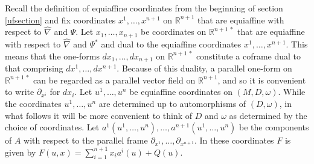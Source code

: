 \documentclass [leqno, 10pt]{amsart}
\theoremstyle{definition}
\numberwithin{equation}{section}
\newcommand{\om}{\omega}
\newcommand{\pr}{\partial}
\newcommand{\hnabla}{\widehat{\nabla}}
\newcommand{\rea}{\mathbb R}
\begin{document}
Recall the definition of equiaffine coordinates from the beginning of section \eqref{ufsection} and fix coordinates $x^{1}, \dots, x^{n+1}$ on $\rea^{n+1}$ that are equiaffine with respect to $\hnabla$ and $\Psi$. Let $x_{1}, \dots, x_{n+1}$ be coordinates on $\rea^{n+1\,\ast}$ that are equiaffine with respect to $\hnabla$ and $\Psi^{\ast}$ and dual to the equiaffine coordinates $x^{1}, \dots, x^{n+1}$. This means that the one-forms $dx_{1}, \dots, dx_{n+1}$ on $\rea^{n+1\,\ast}$ constitute a coframe dual to that comprising $dx^{1}, \dots, dx^{n+1}$. Because of this duality, a parallel one-form on $\rea^{n+1\,\ast}$ can be regarded as a parallel vector field on $\rea^{n+1}$, and so it is convenient to write $\pr_{x^{i}}$ for $dx_{i}$. Let $u^{1}, \dots, u^{n}$ be equiaffine coordinates on $(M, D, \om)$. While the coordinates $u^{1}, \dots, u^{n}$ are determined up to automorphisms of $(D, \om)$, in what follows it will be more convenient to think of $D$ and $\om$ as determined by the choice of coordinates. Let $a^{1}(u^{1}, \dots, u^{n}), \dots, a^{n+1}(u^{1}, \dots, u^{n})$ be the components of $A$ with respect to the parallel frame $\pr_{x^{1}}, \dots, \pr_{x^{n+1}}$. In these coordinates $F$ is given by $F(u, x) = \sum_{i = 1}^{n+1}x_{i}a^{i}(u) + Q(u)$.
\end{document}
